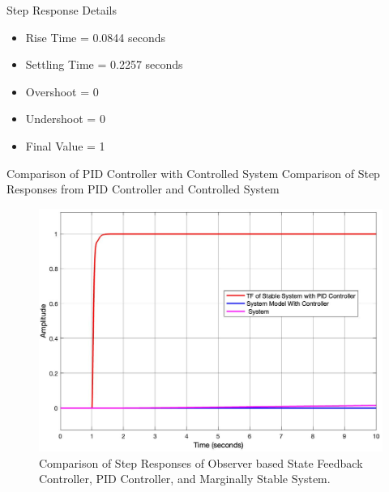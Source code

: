 \documentclass[10pt,compress,mathserif]{beamer}
\begin{document}
\begin{frame}{Step Response Details}
\begin{itemize}
\item Rise Time = 0.0844 seconds
\item Settling Time = 0.2257 seconds
\item Overshoot = 0
\item Undershoot = 0
\item Final Value = 1
\end{itemize}


\end{frame}

\begin{frame}{Comparison of  PID Controller with Controlled System}
Comparison of Step Responses from PID Controller and Controlled System

\vskip10pt
\begin{figure}[h!]
\centering
\includegraphics[scale=0.2]{Comparison.jpg}
\caption{Comparison of Step Responses of Observer based State Feedback Controller, PID Controller, and Marginally Stable System.}
\end{figure}
\end{frame}
\end{document}
